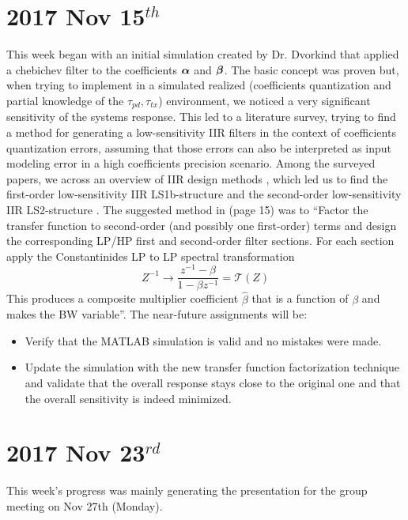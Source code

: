 \documentclass[12pt]{article}
\begin{document}
\section{2017 Nov 15$^{th}$}
This week began with an initial simulation created by Dr. Dvorkind that applied a chebichev filter to the coefficients $ \boldsymbol{\alpha} $ and $ \boldsymbol{\beta} $.
The basic concept was proven but, when trying to implement in a simulated realized (coefficients quantization and partial knowledge of the $ \tau_{pd},\tau_{tx} $) environment, we noticed a very significant sensitivity of the systems response.
This led to a literature survey, trying to find a method for generating a low-sensitivity IIR filters in the context of coefficients quantization errors, assuming that those errors can also be interpreted as input modeling error in a high coefficients precision scenario.
Among the surveyed papers, we across an overview of IIR design methods \cite{ComplexIIRFilterDesign2011Zlatka}, which led us to find the first-order low-sensitivity IIR LS1b-structure \cite{I.P.Topalov1990LOW-SENSITIVITYCYCLES} and the second-order low-sensitivity IIR LS2-structure \cite{StoyanovNEWSECTIONS}.
The suggested method in \cite{ComplexIIRFilterDesign2011Zlatka} (page 15) was to ``Factor the transfer function to second-order (and possibly one first-order) terms and
design the corresponding LP/HP first and second-order filter sections. For each section apply
the Constantinides LP to LP spectral transformation 
$$ Z^{-1} \rightarrow \frac{z^{-1}-\beta}{1-\beta z^{-1}}=\mathcal{T}(Z) $$ 
This produces a composite multiplier coefficient $ \hat{\beta} $ that is a function of $ \beta $ and makes the BW variable''.
The near-future assignments will be:
\begin{itemize}
\item{
Verify that the MATLAB simulation is valid and no mistakes were made.
}
\item{
Update the simulation with the new transfer function factorization technique and validate that the overall response stays close to the original one and that the overall sensitivity is indeed minimized. 
}
\end{itemize}
\section{2017 Nov 23$^{rd}$}
This week's progress was mainly generating the presentation for the group meeting on Nov 27th (Monday).
\end{document}
